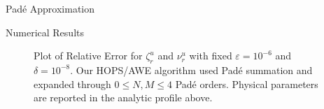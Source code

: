 \begin{section}{Pad\'e Approximation}
\begin{section}{Numerical Results}
\vspace{-21mm}
\begin{figure}[H]
\centering
\vspace{3mm}
\caption{Plot of Relative Error for $\zeta^u_r$ and $\nu^u_r$ with fixed $\varepsilon = 10^{-6}$ and $\delta = 10^{-8}$. Our HOPS/AWE algorithm used Padé summation and expanded through $0\leq N,M \leq 4$ Padé orders. Physical parameters are reported in the analytic profile above.}
\end{figure}





\end{section}
\end{section}
